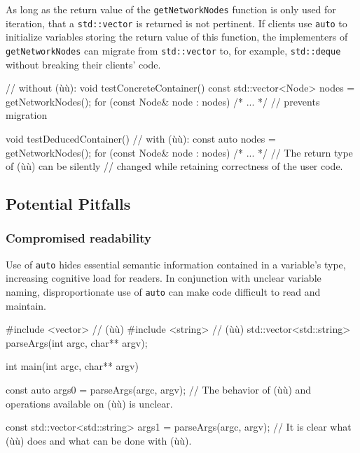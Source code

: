 \noindent As long as the return value of the \lstinline!getNetworkNodes! function is
only used for iteration, that a \lstinline!std::vector! is
returned is not pertinent. If clients use \lstinline!auto! to initialize
variables storing the return value of this function, the implementers of
\lstinline!getNetworkNodes! can migrate from \lstinline!std::vector! to,
for example, \lstinline!std::deque! without breaking their clients'
code.

\begin{emcppslisting}[emcppsbatch=e11]
// without (ù{}ù):
void testConcreteContainer()
{
    const std::vector<Node> nodes = getNetworkNodes();
    for (const Node& node : nodes) { /* ... */ }
        // prevents migration
}

void testDeducedContainer()
{
    // with (ù{}ù):
    const auto nodes = getNetworkNodes();
    for (const Node& node : nodes) { /* ... */ }
        // The return type of (ù{}ù) can be silently
        // changed while retaining correctness of the user code.
}
\end{emcppslisting}
    

\subsection[Potential Pitfalls]{Potential Pitfalls}\label{potential-pitfalls-auto}

\subsubsection[Compromised readability]{Compromised readability}\label{compromised-readability}

Use of \lstinline!auto! hides essential semantic information contained in a
variable's type, increasing cognitive load for readers. In conjunction
with unclear variable naming, disproportionate use of \lstinline!auto! can
make code difficult to read and maintain.

\begin{emcppshiddenlisting}[emcppsbatch=e12]
#include <vector>  // (ù{}ù)
#include <string>  // (ù{}ù)
std::vector<std::string> parseArgs(int argc, char** argv);
\end{emcppshiddenlisting}
\begin{emcppslisting}[emcppsbatch=e12]
int main(int argc, char** argv)
{
    const auto args0 = parseArgs(argc, argv);
        // The behavior of (ù{}ù) and operations available on (ù{}ù) is unclear.

    const std::vector<std::string> args1 = parseArgs(argc, argv);
        // It is clear what (ù{}ù) does and what can be done with (ù{}ù).
}
\end{emcppslisting}
    
